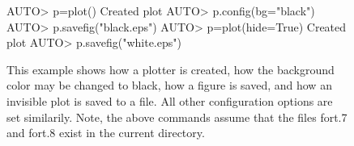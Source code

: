 \documentclass[12pt]{report}
\begin{document}
 \begin{figure}[htbp]
 {\small \begin{center} \begin{boxedverbatim} 
 AUTO> p=plot()
 Created plot
 AUTO> p.config(bg="black")
 AUTO> p.savefig("black.eps")
 AUTO> p=plot(hide=True)
 Created plot
 AUTO> p.savefig("white.eps")
 \end{boxedverbatim}
 \end{center} 
 }
 \caption[Configuring a plotter.]
 {This example shows how a plotter is created,
 how the background color may be changed to black,
 how a figure is saved, and how an invisible plot is
 saved to a file.
 All other configuration options are set similarily.
 Note, the above commands assume that the files
 fort.7 and fort.8 exist in the current directory.
 }
 \label{exa:plotter_example}
 \end{figure}
\end{document}
